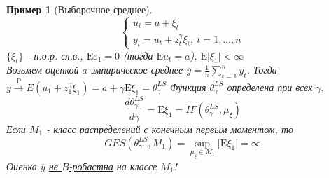 \documentclass[12pt]{article}
\newtheorem*{example}{Пример}
\theoremstyle{basic_theorem}
\theoremstyle{name_theorem}
\def\eps{ \varepsilon }
\def\E{ \mathrm{E} }
\def\P{ \mathrm{P} }
\begin{document}
    \begin{example}[Выборочное среднее]
        \[\begin{cases}
            u_t = a + \xi_t \\
            y_t = u_t + z^\gamma_t\xi_t, \ t=1,\ldots,n
        \end{cases}\]
        $\{\xi_t\}$ - н.о.р. сл.в., $\E\eps_1=0$ (тогда $\E u_t=a$), $\E\vert\xi_1\vert<\infty$ \\
        Возьмем оценкой $a$ эмпирическое среднее $\overline{y}=\frac{1}{n}\sum_{t=1}^ny_t$.
        Тогда $\overline{y}\xrightarrow{\P}E(u_1+z_1^\gamma\xi_1)=a+\gamma\E\xi_1=\theta^{LS}_\gamma$
        Функция $\theta_\gamma^{LS}$ определена при всех $\gamma$,
        \[\frac{d\theta_\gamma^{LS}}{d\gamma}=\E\xi_1=IF(\theta_\gamma^{LS}, \mu_\xi)\]
        Если $M_1$ - класс распределений с конечным первым моментом, то
        \[GES(\theta_\gamma^{LS}, M_1) = \sup_{\mu_\xi\in M_1} \vert\E\xi_1\vert = \infty\]
        Оценка $\overline{y}$ \underline{не $B$-робастна} на  классе $M_1$!
    \end{example}
\end{document}
